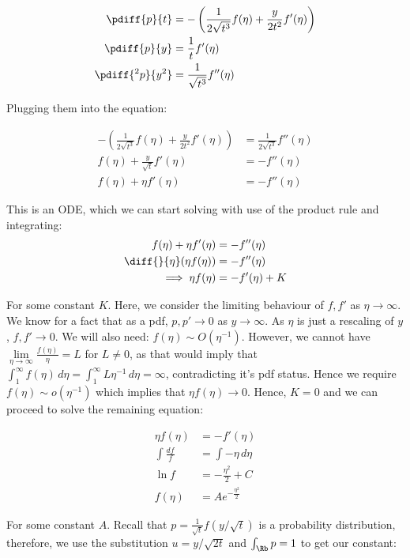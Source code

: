 \documentclass{article}
\begin{document}
	\begin{align*}
		\pdiff{p}{t} &= -\left(\frac{1}{2\sqrt{t^3}} f(\eta) + \frac{y}{2t^2} f'(\eta)\right) \\
		\pdiff{p}{y} &= \frac{1}{t}f'(\eta) \\
		\pdiff{^2p}{y^2} &= \frac{1}{\sqrt{t^3}}f''(\eta)
	\end{align*}
	
	Plugging them into the equation:
	
	\begin{align*}
		 -\left(\frac{1}{2\sqrt{t^3}} f(\eta) + \frac{y}{2t^2} f'(\eta)\right) &= \frac{1}{2\sqrt{t^3}}f''(\eta) \\
		 f(\eta) + \frac{y}{\sqrt{t}} f'(\eta) &= -f''(\eta) \\
		 f(\eta) + \eta f'(\eta) &= -f''(\eta)
	\end{align*}
	
	This is an ODE, which we can start solving with use of the product rule and integrating:
	\begin{align*}
		f(\eta) + \eta f'(\eta) &= -f''(\eta) \\
		\diff{}{\eta} (\eta f(\eta)) &= -f''(\eta) \\
		\implies \eta f(\eta) &= -f'(\eta) + K
	\end{align*}
	
	For some constant $K$. Here, we consider the limiting behaviour of $f,f'$ as $\eta \rightarrow \infty$. We know for a fact that as a pdf, $p,p' \rightarrow 0$ as $y \rightarrow \infty$. As $\eta$ is just a rescaling of $y$,  $f,f' \rightarrow 0$. We will also need: $f(\eta) \sim O(\eta^{-1})$. However, we cannot have $\lim\limits_{\eta \rightarrow \infty} \frac{f(\eta)}{\eta} = L$ for $L \neq 0$, as that would imply that $\int_1^\infty f(\eta) \, d\eta = \int_1^\infty L \eta^{-1} \, d\eta = \infty$, contradicting it's pdf status. Hence we require $ f(\eta) \sim o(\eta^{-1})$ which implies that $\eta f(\eta) \rightarrow 0$. Hence, $K=0$ and we can proceed to solve the remaining equation:
	
	\begin{align*}
		\eta f(\eta) &= -f'(\eta) \\
		\int \frac{df}{f} &= \int -\eta \, d\eta \\
		\ln f &= -\frac{\eta^2}{2} + C \\
		f(\eta) &= Ae^{-\frac{\eta^2}{2}}
	\end{align*}
	
	For some constant $A$. Recall that $p = \frac{1}{\sqrt{t}}f(y/\sqrt{t})$ is a probability distribution, therefore, we use the substitution $u = y / \sqrt{2t}$ and $\int_\Rb p = 1$ to get our constant:
	
\end{document}
